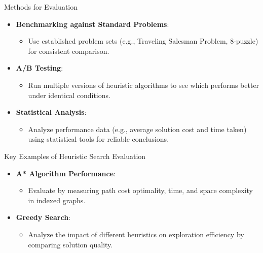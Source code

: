 \documentclass[aspectratio=169]{beamer}
\begin{document}
\begin{frame}[fragile]{Methods for Evaluation}
    \begin{itemize}
        \item \textbf{Benchmarking against Standard Problems}:
        \begin{itemize}
            \item Use established problem sets (e.g., Traveling Salesman Problem, 8-puzzle) for consistent comparison.
        \end{itemize}
        
        \item \textbf{A/B Testing}:
        \begin{itemize}
            \item Run multiple versions of heuristic algorithms to see which performs better under identical conditions.
        \end{itemize}

        \item \textbf{Statistical Analysis}:
        \begin{itemize}
            \item Analyze performance data (e.g., average solution cost and time taken) using statistical tools for reliable conclusions.
        \end{itemize}
    \end{itemize}
\end{frame}

\begin{frame}[fragile]{Key Examples of Heuristic Search Evaluation}
    \begin{itemize}
        \item \textbf{A* Algorithm Performance}:
        \begin{itemize}
            \item Evaluate by measuring path cost optimality, time, and space complexity in indexed graphs.
        \end{itemize}
        
        \item \textbf{Greedy Search}:
        \begin{itemize}
            \item Analyze the impact of different heuristics on exploration efficiency by comparing solution quality.
        \end{itemize}
    \end{itemize}
\end{frame}
\end{document}
